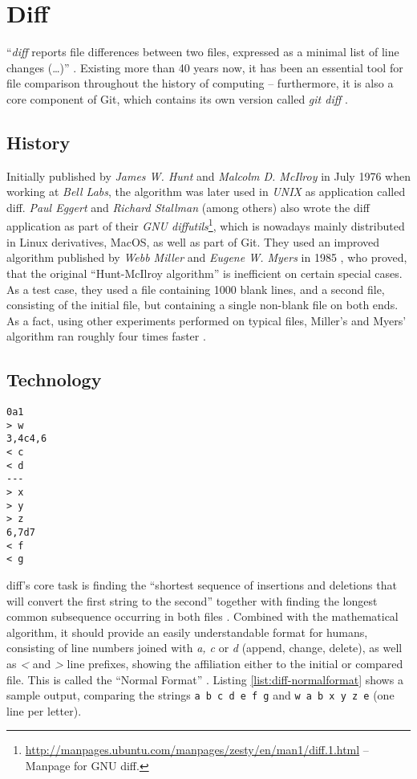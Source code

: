 \section{Diff}
\label{sec:diff}

``\emph{diff} reports file differences between two files, expressed as a minimal list of line changes (\ldots)'' \cite[1]{Hunt1976}. Existing more than 40 years now, it has been an essential tool for file comparison throughout the history of computing -- furthermore, it is also a core component of Git, which contains its own version called \emph{git diff} \cite[108]{loeliger2012version}.

\subsection{History}
\label{sec:diff-history}
Initially published by \emph{James W. Hunt} and \emph{Malcolm D. McIlroy} in July 1976 when working at \emph{Bell Labs}, the algorithm was later used in \emph{UNIX} as application called diff. \emph{Paul Eggert} and \emph{Richard Stallman} (among others) also wrote the diff application as part of their \emph{GNU diffutils}\footnote{\url{http://manpages.ubuntu.com/manpages/zesty/en/man1/diff.1.html} -- Manpage for GNU diff.}, which is nowadays mainly distributed in Linux derivatives, MacOS, as well as part of Git. They used an improved algorithm published by \emph{Webb Miller} and \emph{Eugene W. Myers} in 1985 \cite[3]{mackenzie2003comparing}, who proved, that the original ``Hunt-McIlroy algorithm'' is inefficient on certain special cases. As a test case, they used a file containing 1000 blank lines, and a second file, consisting of the initial file, but containing a single non-blank file on both ends. As a fact, using other experiments performed on typical files, Miller's and Myers' algorithm ran roughly four times faster \cite[p. 1034f]{miller1985file}.

\subsection{Technology}
\label{sec:diff-technology}

\begin{lstlisting}[label={list:diff-normalformat}, caption=sample.diff]
0a1
> w
3,4c4,6
< c
< d
---
> x
> y
> z
6,7d7
< f
< g
\end{lstlisting}

diff's core task is finding the ``shortest sequence of insertions and deletions that will convert the first string to the second'' \cite[1025]{miller1985file} together with finding the longest common subsequence occurring in both files \cite[2]{Hunt1976}. Combined with the mathematical algorithm, it should provide an easily understandable format for humans, consisting of line numbers joined with \emph{a, c} or \emph{d} (append, change, delete), as well as \emph{<} and \emph{>} line prefixes, showing the affiliation either to the initial or compared file. This is called the ``Normal Format'' \cite[12]{mackenzie2003comparing}. Listing \ref{list:diff-normalformat} shows a sample output, comparing the strings \texttt{a b c d e f g} and \texttt{w a b x y z e} (one line per letter)\cite[p. 1f]{Hunt1976}.



